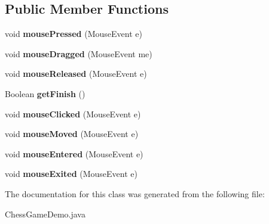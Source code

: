 \subsection*{Public Member Functions}
\begin{DoxyCompactItemize}
\item 
\hypertarget{class_chess_game_demo_ab52c4364333b4e4ec27bd731c7b2256f}{void {\bfseries mouse\-Pressed} (Mouse\-Event e)}\label{class_chess_game_demo_ab52c4364333b4e4ec27bd731c7b2256f}

\item 
\hypertarget{class_chess_game_demo_a20232f9f79c24183355215d5d9fb97f8}{void {\bfseries mouse\-Dragged} (Mouse\-Event me)}\label{class_chess_game_demo_a20232f9f79c24183355215d5d9fb97f8}

\item 
\hypertarget{class_chess_game_demo_a4ed6a1f2ef893a991284314aff24ccdd}{void {\bfseries mouse\-Released} (Mouse\-Event e)}\label{class_chess_game_demo_a4ed6a1f2ef893a991284314aff24ccdd}

\item 
\hypertarget{class_chess_game_demo_a72b1027bb8e3c6e29a098408e0e800f6}{Boolean {\bfseries get\-Finish} ()}\label{class_chess_game_demo_a72b1027bb8e3c6e29a098408e0e800f6}

\item 
\hypertarget{class_chess_game_demo_a004e02ac96f039240269badbf2d08b8c}{void {\bfseries mouse\-Clicked} (Mouse\-Event e)}\label{class_chess_game_demo_a004e02ac96f039240269badbf2d08b8c}

\item 
\hypertarget{class_chess_game_demo_a91cb907f923dafdfc2e98b4a0d64f608}{void {\bfseries mouse\-Moved} (Mouse\-Event e)}\label{class_chess_game_demo_a91cb907f923dafdfc2e98b4a0d64f608}

\item 
\hypertarget{class_chess_game_demo_a5adfb134fa4f1f85c234fac389408eca}{void {\bfseries mouse\-Entered} (Mouse\-Event e)}\label{class_chess_game_demo_a5adfb134fa4f1f85c234fac389408eca}

\item 
\hypertarget{class_chess_game_demo_a37c5d938478f8ff26d889db218343cb9}{void {\bfseries mouse\-Exited} (Mouse\-Event e)}\label{class_chess_game_demo_a37c5d938478f8ff26d889db218343cb9}

\end{DoxyCompactItemize}


The documentation for this class was generated from the following file\-:\begin{DoxyCompactItemize}
\item 
Chess\-Game\-Demo.\-java\end{DoxyCompactItemize}
